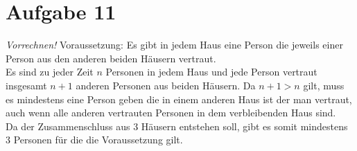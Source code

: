 \documentclass[paper = a4, ngerman]{scrartcl}
\begin{document}
\pagebreak
	\section*{Aufgabe 11}
		\textit{Vorrechnen!}
		Voraussetzung: Es gibt in jedem Haus eine Person die jeweils einer Person aus den anderen beiden Häusern vertraut.\\
		Es sind zu jeder Zeit $n$ Personen in jedem Haus und jede Person vertraut insgesamt $n+1$ anderen Personen aus beiden Häusern. Da $n+1 > n$ gilt, muss es mindestens eine Person geben die in einem anderen Haus ist der man vertraut, auch wenn alle anderen vertrauten Personen in dem verbleibenden Haus sind.\\
		Da der Zusammenschluss aus 3 Häusern entstehen soll, gibt es somit mindestens 3 Personen für die die Voraussetzung gilt.
\end{document}

